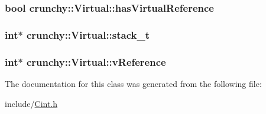 \subsubsection[{has\+Virtual\+Reference}]{\setlength{\rightskip}{0pt plus 5cm}bool crunchy\+::\+Virtual\+::has\+Virtual\+Reference}\label{classcrunchy_1_1_virtual_a9dd9b11712ab44b00696838fc1da2c43}
\hypertarget{classcrunchy_1_1_virtual_ad108e31577fcad0d6ff9ff6d7b3d5249}{}
\subsubsection[{stack\+\_\+t}]{\setlength{\rightskip}{0pt plus 5cm}int$\ast$ crunchy\+::\+Virtual\+::stack\+\_\+t\hspace{0.3cm}{\ttfamily [static]}}\label{classcrunchy_1_1_virtual_ad108e31577fcad0d6ff9ff6d7b3d5249}
\hypertarget{classcrunchy_1_1_virtual_acf317286283a3916ccb1d4752074af5f}{}
\subsubsection[{v\+Reference}]{\setlength{\rightskip}{0pt plus 5cm}int$\ast$ crunchy\+::\+Virtual\+::v\+Reference}\label{classcrunchy_1_1_virtual_acf317286283a3916ccb1d4752074af5f}


The documentation for this class was generated from the following file\+:\begin{DoxyCompactItemize}
\item 
include/\hyperlink{_cint_8h}{Cint.\+h}\end{DoxyCompactItemize}
